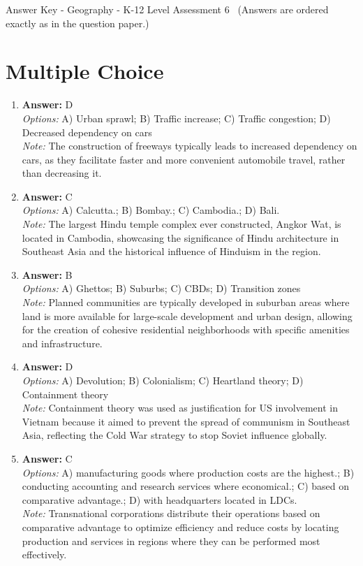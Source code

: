 \documentclass[12pt]{article}
\begin{document}
\begin{center}
Answer Key - Geography - K-12 Level Assessment 6 \
\small (Answers are ordered exactly as in the question paper.)
\end{center}

\section*{Multiple Choice}
\begin{enumerate}[label=\arabic*.]
\item \textbf{Answer:} D
\\ \textit{Options:} A) Urban sprawl; B) Traffic increase; C) Traffic congestion; D) Decreased dependency on cars
\\ \textit{Note:} The construction of freeways typically leads to increased dependency on cars, as they facilitate faster and more convenient automobile travel, rather than decreasing it.
\item \textbf{Answer:} C
\\ \textit{Options:} A) Calcutta.; B) Bombay.; C) Cambodia.; D) Bali.
\\ \textit{Note:} The largest Hindu temple complex ever constructed, Angkor Wat, is located in Cambodia, showcasing the significance of Hindu architecture in Southeast Asia and the historical influence of Hinduism in the region.
\item \textbf{Answer:} B
\\ \textit{Options:} A) Ghettos; B) Suburbs; C) CBDs; D) Transition zones
\\ \textit{Note:} Planned communities are typically developed in suburban areas where land is more available for large-scale development and urban design, allowing for the creation of cohesive residential neighborhoods with specific amenities and infrastructure.
\item \textbf{Answer:} D
\\ \textit{Options:} A) Devolution; B) Colonialism; C) Heartland theory; D) Containment theory
\\ \textit{Note:} Containment theory was used as justification for US involvement in Vietnam because it aimed to prevent the spread of communism in Southeast Asia, reflecting the Cold War strategy to stop Soviet influence globally.
\item \textbf{Answer:} C
\\ \textit{Options:} A) manufacturing goods where production costs are the highest.; B) conducting accounting and research services where economical.; C) based on comparative advantage.; D) with headquarters located in LDCs.
\\ \textit{Note:} Transnational corporations distribute their operations based on comparative advantage to optimize efficiency and reduce costs by locating production and services in regions where they can be performed most effectively.
\end{enumerate}
\end{document}
